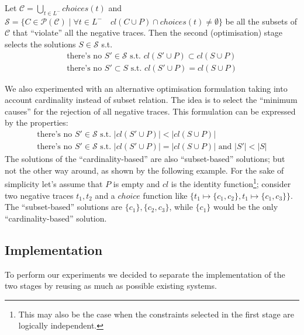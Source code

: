 Let $\mathcal{C} = \bigcup_{t\in L^-} choices(t)$ and $\mathcal{S}=\{C\in\mathcal{P}(\mathcal{C})\mid \forall t\in L^-\quad cl(C\cup P)\cap choices(t)\neq \emptyset\}$ be all the subsets of $\mathcal{C}$ that ``violate'' all the negative traces. Then the second (optimisation) stage selects the solutions $S\in \mathcal{S}$ s.t.
\begin{subequations}
  \begin{align}
    \text{there's no $S'\in\mathcal{S}$ s.t. } cl(S'\cup P)\subset cl(S\cup P)\\
    \text{there's no $S'\subset S$ s.t. } cl(S'\cup P)=cl(S\cup P)
  \end{align}
\end{subequations}

We also experimented with an alternative optimisation formulation taking into account cardinality instead of subset relation. The idea is to select the ``minimum causes'' for the rejection of all negative traces. This formulation can be expressed by the properties:
\begin{subequations}
  \begin{align}
    \text{there's no $S'\in\mathcal{S}$ s.t. } |cl(S'\cup P)| < |cl(S\cup P)|\\
    \text{there's no $S'\in\mathcal{S}$ s.t. } |cl(S'\cup P)|=|cl(S\cup P)| \text{ and } |S'| < |S|
  \end{align}
\end{subequations}
The solutions of the ``cardinality-based'' are also ``subset-based'' solutions; but not the other way around, as shown by the following example. For the sake of simplicity let's assume that $P$ is empty and $cl$ is the identity function\footnote{This may also be the case when the constraints selected in the first stage are logically independent.}; consider two negative traces $t_1, t_2$ and a $choice$ function like $\{t_1\mapsto\{c_1, c_2\}, t_1\mapsto\{c_1, c_3\}\}$. The ``subset-based'' solutions are $\{c_1\}, \{c_2, c_3\}$, while $\{c_1\}$ would be the only ``cardinality-based'' solution.

\subsection*{Implementation}

To perform our experiments we decided to separate the implementation of the two stages by reusing as much as possible existing systems.

